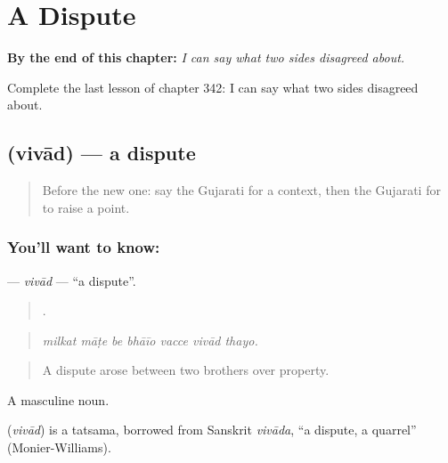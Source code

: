 
\chapter{A Dispute}
\label{ch:gu-a-dispute}

\begin{chapteropening}
\textbf{By the end of this chapter:} \emph{I can say what two sides disagreed about.}

Complete the last lesson of chapter 342: I can say what two sides disagreed about.
\end{chapteropening}

\section[\texorpdfstring{\gu{વિવાદ} (vivād)}{વિવાદ (vivād)}]{ (vivād) — a dispute}

\label{lesson:GU-C342-vivad}



\begin{quote}
Before the new one: say the Gujarati for a context, then the Gujarati for to raise a point.
\end{quote}

\subsection*{You'll want to know: }
\textbf{} — \emph{vivād} — \textquotedblleft{}a dispute\textquotedblright{}.

\begin{quote}
      .
\end{quote}

\begin{quote}
\emph{milkat māṭe be bhāīo vacce vivād thayo.}
\end{quote}

\begin{quote}
A dispute arose between two brothers over property.
\end{quote}

A masculine noun.

\begin{cousinweb}
\textbf{} (\emph{vivād}) is a tatsama, borrowed from Sanskrit \emph{vivāda}, \textquotedblleft{}a dispute, a quarrel\textquotedblright{} (Monier-Williams).
\end{cousinweb}

